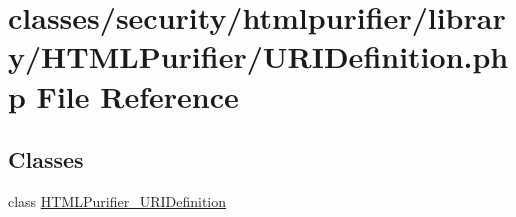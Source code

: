 \hypertarget{URIDefinition_8php}{\section{classes/security/htmlpurifier/library/\+H\+T\+M\+L\+Purifier/\+U\+R\+I\+Definition.php File Reference}
\label{URIDefinition_8php}
}
\subsection*{Classes}
\begin{DoxyCompactItemize}
\item 
class \hyperlink{classHTMLPurifier__URIDefinition}{H\+T\+M\+L\+Purifier\+\_\+\+U\+R\+I\+Definition}
\end{DoxyCompactItemize}
